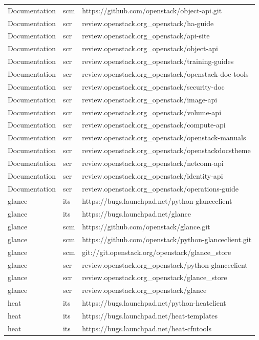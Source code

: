 \begin{center}
\begin{longtable}{|p{4cm}|p{1cm}|p{10cm}|}
Documentation&scm&https://github.com/openstack/object-api.git\\ 
Documentation&scr&review.openstack.org\_openstack/ha-guide\\ 
Documentation&scr&review.openstack.org\_openstack/api-site\\ 
Documentation&scr&review.openstack.org\_openstack/object-api\\ 
Documentation&scr&review.openstack.org\_openstack/training-guides\\ 
Documentation&scr&review.openstack.org\_openstack/openstack-doc-tools\\ 
Documentation&scr&review.openstack.org\_openstack/security-doc\\ 
Documentation&scr&review.openstack.org\_openstack/image-api\\ 
Documentation&scr&review.openstack.org\_openstack/volume-api\\ 
Documentation&scr&review.openstack.org\_openstack/compute-api\\ 
Documentation&scr&review.openstack.org\_openstack/openstack-manuals\\ 
Documentation&scr&review.openstack.org\_openstack/openstackdocstheme\\ 
Documentation&scr&review.openstack.org\_openstack/netconn-api\\ 
Documentation&scr&review.openstack.org\_openstack/identity-api\\ 
Documentation&scr&review.openstack.org\_openstack/operations-guide\\ 
glance&its&https://bugs.launchpad.net/python-glanceclient\\ 
glance&its&https://bugs.launchpad.net/glance\\ 
glance&scm&https://github.com/openstack/glance.git\\ 
glance&scm&https://github.com/openstack/python-glanceclient.git\\ 
glance&scm&git://git.openstack.org/openstack/glance\_store\\ 
glance&scr&review.openstack.org\_openstack/python-glanceclient\\ 
glance&scr&review.openstack.org\_openstack/glance\_store\\ 
glance&scr&review.openstack.org\_openstack/glance\\ 
heat&its&https://bugs.launchpad.net/python-heatclient\\ 
heat&its&https://bugs.launchpad.net/heat-templates\\ 
heat&its&https://bugs.launchpad.net/heat-cfntools\\ 

\end{longtable}
\end{center}
